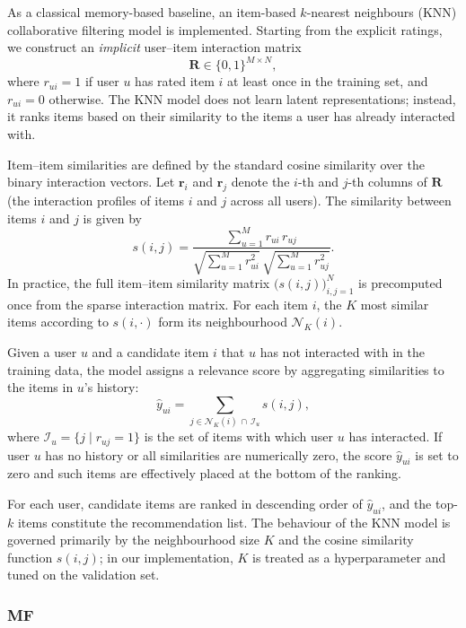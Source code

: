 \documentclass[11pt]{article}
\begin{document}
As a classical memory-based baseline, an item-based $k$-nearest neighbours (KNN) collaborative filtering model is implemented. Starting from the explicit ratings, we construct an \emph{implicit} user–item interaction matrix 
\[
    \mathbf{R} \in \{0,1\}^{M \times N},
\]
where $r_{ui} = 1$ if user $u$ has rated item $i$ at least once in the training set, and $r_{ui} = 0$ otherwise. The KNN model does not learn latent representations; instead, it ranks items based on their similarity to the items a user has already interacted with.

Item–item similarities are defined by the standard cosine similarity over the binary interaction vectors. Let $\mathbf{r}_i$ and $\mathbf{r}_j$ denote the $i$-th and $j$-th columns of $\mathbf{R}$ (the interaction profiles of items $i$ and $j$ across all users). The similarity between items $i$ and $j$ is given by
\[
    s(i,j)
    =
    \frac{\displaystyle \sum_{u=1}^{M} r_{ui}\, r_{uj}}
         {\sqrt{\displaystyle \sum_{u=1}^{M} r_{ui}^{2}}
          \,\sqrt{\displaystyle \sum_{u=1}^{M} r_{uj}^{2}}}.
\]
In practice, the full item–item similarity matrix $\bigl(s(i,j)\bigr)_{i,j=1}^{N}$ is precomputed once from the sparse interaction matrix. For each item $i$, the $K$ most similar items according to $s(i,\cdot)$ form its neighbourhood $\mathcal{N}_K(i)$.

Given a user $u$ and a candidate item $i$ that $u$ has not interacted with in the training data, the model assigns a relevance score by aggregating similarities to the items in $u$’s history:
\[
    \hat{y}_{ui}
    =
    \sum_{j \in \mathcal{N}_K(i) \,\cap\, \mathcal{I}_u} s(i,j),
\]
where $\mathcal{I}_u = \{ j \mid r_{uj} = 1 \}$ is the set of items with which user $u$ has interacted. If user $u$ has no history or all similarities are numerically zero, the score $\hat{y}_{ui}$ is set to zero and such items are effectively placed at the bottom of the ranking.

For each user, candidate items are ranked in descending order of $\hat{y}_{ui}$, and the top-$k$ items constitute the recommendation list. The behaviour of the KNN model is governed primarily by the neighbourhood size $K$ and the cosine similarity function $s(i,j)$; in our implementation, $K$ is treated as a hyperparameter and tuned on the validation set.

\subsubsection{MF}
\end{document}
